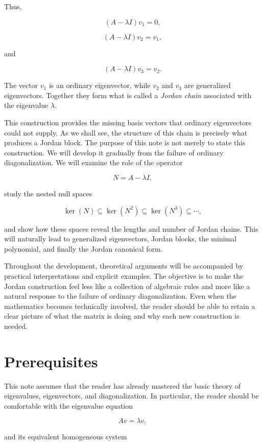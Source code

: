 \documentclass[11pt]{article}
\begin{document}
Thus,

\[
(A-\lambda I)v_1=0,
\]

\[
(A-\lambda I)v_2=v_1,
\]

and

\[
(A-\lambda I)v_3=v_2.
\]

The vector \(v_1\) is an ordinary eigenvector, while \(v_2\) and
\(v_3\) are generalized eigenvectors.  Together they form what is
called a \emph{Jordan chain} associated with the eigenvalue
\(\lambda\).

This construction provides the missing basis vectors that ordinary
eigenvectors could not supply.  As we shall see, the structure of this
chain is precisely what produces a Jordan block.
The purpose of this note is not merely to state this construction.
We will develop it gradually from the failure of ordinary
diagonalization.  We will examine the role of the operator

\[
N=A-\lambda I,
\]

study the nested null spaces

\[
\ker(N)
\subseteq
\ker(N^2)
\subseteq
\ker(N^3)
\subseteq\cdots,
\]

and show how these spaces reveal the lengths and number of Jordan
chains.  This will naturally lead to generalized eigenvectors, Jordan
blocks, the minimal polynomial, and finally the Jordan canonical form.

Throughout the development, theoretical arguments will be accompanied
by practical interpretations and explicit examples.  The objective is
to make the Jordan construction feel less like a collection of
algebraic rules and more like a natural response to the failure of
ordinary diagonalization.  Even when the mathematics becomes
technically involved, the reader should be able to retain a clear
picture of what the matrix is doing and why each new construction is
needed.

\section{Prerequisites}

This note assumes that the reader has already mastered the basic
theory of eigenvalues, eigenvectors, and diagonalization.  In
particular, the reader should be comfortable with the eigenvalue
equation

\[
Av=\lambda v,
\]

and its equivalent homogeneous system
\end{document}
